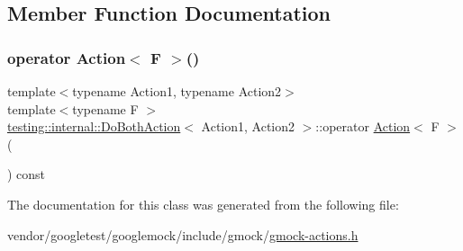 \subsection{Member Function Documentation}
\mbox{\label{classtesting_1_1internal_1_1_do_both_action_a35733e2f117daad110bfbd3de84634a6}} 
\subsubsection{\texorpdfstring{operator Action$<$ F $>$()}{operator Action< F >()}}
{\footnotesize\ttfamily template$<$typename Action1, typename Action2$>$ \\
template$<$typename F $>$ \\
\hyperlink{classtesting_1_1internal_1_1_do_both_action}{testing\+::internal\+::\+Do\+Both\+Action}$<$ Action1, Action2 $>$\+::operator \hyperlink{classtesting_1_1_action}{Action}$<$ F $>$ (\begin{DoxyParamCaption}{ }\end{DoxyParamCaption}) const\hspace{0.3cm}{\ttfamily [inline]}}



The documentation for this class was generated from the following file\+:\begin{DoxyCompactItemize}
\item 
vendor/googletest/googlemock/include/gmock/\hyperlink{gmock-actions_8h}{gmock-\/actions.\+h}\end{DoxyCompactItemize}
